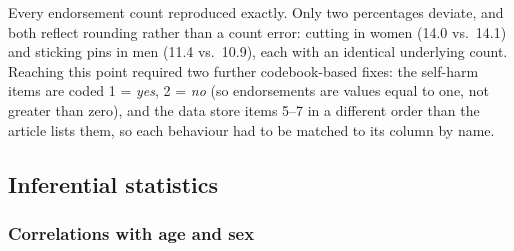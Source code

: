 \documentclass[
  english,
  man,floatsintext]{apa6}
\begin{document}
Every endorsement count reproduced exactly. Only two percentages deviate, and both reflect rounding rather than a count error: cutting in women (14.0 vs.~14.1) and sticking pins in men (11.4 vs.~10.9), each with an identical underlying count. Reaching this point required two further codebook-based fixes: the self-harm items are coded 1 = \emph{yes}, 2 = \emph{no} (so endorsements are values equal to one, not greater than zero), and the data store items 5--7 in a different order than the article lists them, so each behaviour had to be matched to its column by name.

\subsection{Inferential statistics}\label{inferential-statistics}

\subsubsection{Correlations with age and sex}\label{correlations-with-age-and-sex}
\end{document}

